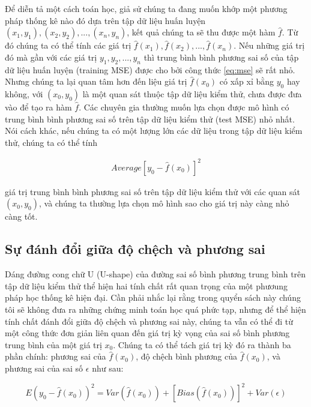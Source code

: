 \documentclass[
]{article}
\begin{document}
Để diễn tả một cách toán học, giả sử chúng ta đang muốn khớp một phương pháp thống kê nào đó dựa trên tập dữ liệu huấn luyện \({(x_1, y_1), (x_2, y_2),...,(x_n, y_n)}\), kết quả chúng ta sẽ thu được một hàm \(\hat{f}\). Từ đó chúng ta có thể tính các giá trị \(\hat{f}(x_1), \hat{f}(x_2),..., \hat{f}(x_n)\). Nếu những giá trị đó mà gần với các giá trị \(y_1, y_2,...,y_n\) thì trung bình bình phương sai số của tập dữ liệu huấn luyện (training MSE) được cho bởi công thức \eqref{eq:mse} sẽ rất nhỏ. Nhưng chúng ta lại quan tâm hơn đến liệu giá trị \(\hat{f}(x_0)\) có xấp xỉ bằng \(y_0\) hay không, với \((x_0, y_0)\) là một quan sát thuộc tập dữ liệu kiểm thử, chưa được đưa vào để tạo ra hàm \(\hat{f}\). Các chuyên gia thường muốn lựa chọn được mô hình có trung bình bình phương sai số trên tập dữ liệu kiểm thử (test MSE) nhỏ nhất. Nói cách khác, nếu chúng ta có một lượng lớn các dữ liệu trong tập dữ liệu kiểm thử, chúng ta có thể tính

\begin{align}
Average\left[y_0 - \hat{f}(x_0)\right]^2 
\end{align}

giá trị trung bình bình phương sai số trên tập dữ liệu kiểm thử với các quan sát \((x_0, y_0)\), và chúng ta thường lựa chọn mô hình sao cho giá trị này càng nhỏ càng tốt.

\hypertarget{sux1ef1-ux111uxe1nh-ux111ux1ed5i-giux1eefa-ux111ux1ed9-chux1ec7ch-vuxe0-phux1b0ux1a1ng-sai}{%
\subsection{Sự đánh đổi giữa độ chệch và phương sai}\label{sux1ef1-ux111uxe1nh-ux111ux1ed5i-giux1eefa-ux111ux1ed9-chux1ec7ch-vuxe0-phux1b0ux1a1ng-sai}}

Dáng đường cong chữ U (U-shape) của đường sai số bình phương trung bình trên tập dữ liệu kiểm thử thể hiện hai tính chất rất quan trọng của một phươung pháp học thống kê hiện đại. Cần phải nhắc lại rằng trong quyển sách này chúng tôi sẽ không đưa ra những chứng minh toán học quá phức tạp, nhưng để thể hiện tính chất đánh đổi giữa độ chệch và phương sai này, chúng ta vẫn có thể đi từ một công thức đơn giản liên quan đến giá trị kỳ vọng của sai số bình phương trung bình của một giá trị \(x_0\). Chúng ta có thể tách giá trị kỳ đó ra thành ba phần chính: phương sai của \(\hat{f}(x_0)\), độ chệch bình phương của \(\hat{f}(x_0)\), và phương sai của sai số \(\epsilon\) như sau:

\begin{equation}
E\left(y_0 - \hat{f}(x_0)\right)^2 = Var\left(\hat{f}(x_0)\right) + \left[Bias(\hat{f}(x_0))\right]^2 + Var(\epsilon)
\label{eq:bias_variance}
\end{equation}
\end{document}
